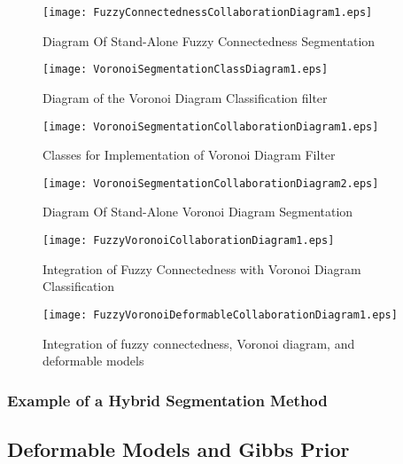 \begin{figure}
\center
\texttt{[image: FuzzyConnectednessCollaborationDiagram1.eps]}
\caption{Diagram Of Stand-Alone Fuzzy Connectedness Segmentation}
\label{fig:UMLCollaborationDiagramoftheFuzzyConnectednessFilter}
\end{figure}

\begin{figure}
\center
\texttt{[image: VoronoiSegmentationClassDiagram1.eps]}
\caption{Diagram of the Voronoi Diagram Classification filter}
\label{fig:UMLVoronoiSegmentationClassFilter}
\end{figure}

\begin{figure}
\center
\texttt{[image: VoronoiSegmentationCollaborationDiagram1.eps]}
\caption{Classes for Implementation of Voronoi Diagram Filter}
\label{fig:UMLClassesforImplementationofVoronoiDiagramFilter}
\end{figure}


\begin{figure}
\center
\texttt{[image: VoronoiSegmentationCollaborationDiagram2.eps]}
\caption{Diagram Of Stand-Alone Voronoi Diagram Segmentation}
\label{fig:UMLCollaborationDiagramoftheVoronoiSegmentationFilter}
\end{figure}


\begin{figure}
\center
\texttt{[image: FuzzyVoronoiCollaborationDiagram1.eps]}
\caption{Integration of Fuzzy Connectedness with Voronoi Diagram Classification}
\label{fig:UMLHybridMethodDiagram1}
\end{figure}

\begin{figure}
\center
\texttt{[image: FuzzyVoronoiDeformableCollaborationDiagram1.eps]}
\caption{Integration of fuzzy connectedness, Voronoi diagram, and deformable models}
\label{fig:UMLHybridMethodDiagram2}
\end{figure}



\subsubsection{Example of a Hybrid Segmentation Method}
\label{sec:HybridMethod1:Example}





\subsection{Deformable Models and Gibbs Prior}

